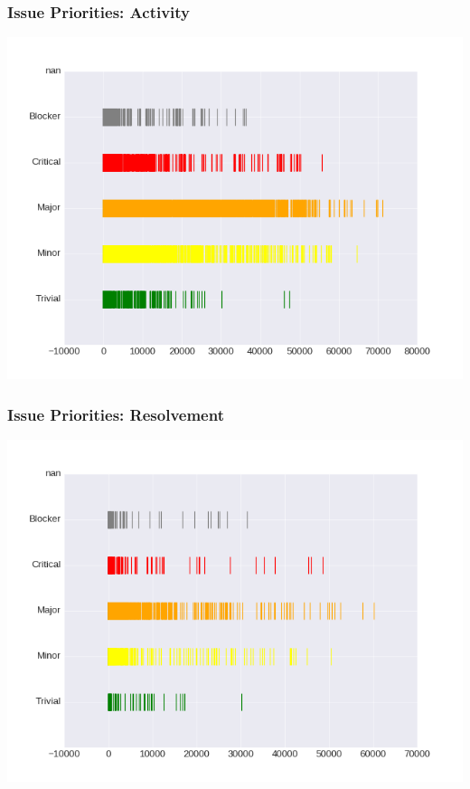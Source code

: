\documentclass{beamer}
\begin{document}
\begin{frame}\frametitle{Issue Priorities: Activity}
\centering
\includegraphics[width=\textwidth]{./issue_event_activity.png}
\end{frame}

\begin{frame}\frametitle{Issue Priorities: Resolvement}
\centering
\includegraphics[width=\textwidth]{./issue_solve.png}
\end{frame}
\end{document}
